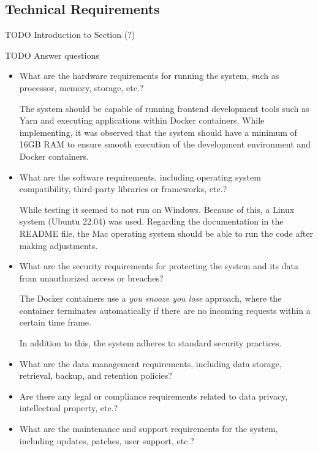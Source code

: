 \documentclass[../MasterThesis.tex]{subfiles}
\begin{document}
\subsection{Technical Requirements} \label{subsection:technicalrequirements}


TODO Introduction to Section (?)

TODO Answer questions

\begin{itemize}

\item What are the hardware requirements for running the system, such as processor, memory, storage, etc.?

The system should be capable of running frontend development tools such as Yarn and executing applications within Docker containers.
While implementing, it was observed that the system should have a minimum of 16GB RAM to ensure smooth execution of the development environment and Docker containers.



\item What are the software requirements, including operating system compatibility, third-party libraries or frameworks, etc.?

While testing it seemed to not run on Windows. Because of this, a Linux system (Ubuntu 22.04) was used. Regarding the documentation in the README file, the Mac operating system should be able to run the code after making adjustments.



\item What are the security requirements for protecting the system and its data from unauthorized access or breaches?

The Docker containers use a \textit{you snooze you lose} approach, where the container terminates automatically if there are no incoming requests within a certain time frame. 

In addition to this, the system adheres to standard security practices.




\item What are the data management requirements, including data storage, retrieval, backup, and retention policies?

\item Are there any legal or compliance requirements related to data privacy, intellectual property, etc.?

\item What are the maintenance and support requirements for the system, including updates, patches, user support, etc.?
	
\end{itemize}	
	
	
	
	
\end{document}
